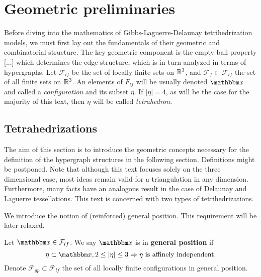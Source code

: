 \chapter{Geometric preliminaries}
Before diving into the mathematics of Gibbs-Laguerre-Delaunay tetrihedrization models, we must first lay out the fundamentals of their geometric and combinatorial structure. The key geometric component is the empty ball property [...] which determines the edge structure, which is in turn analyzed in terms of hypergraphs.
Let $\mathcal F_{lf}$ be the set of locally finite sets on ${\mathbb R^3}$, and $\mathcal F_{f} \subset \mathcal F_{lf}$ the set of all finite sets on ${\mathbb R^3}$. An elements of $F_{lf}$ will be usually denoted $\x$ and called a \textit{configuration} and its subset $\eta$. If $|\eta|=4$, as will be the case for the majority of this text, then $\eta$ will be called \textit{tetrahedron}.


\section{Tetrahedrizations}
The aim of this section is to introduce the geometric concepts necessary for the definition of the hypergraph structures in the following section. Definitions might be postponed. Note that although this text focuses solely on the three dimensional case, most ideas remain valid for a triangulation in any dimension. Furthermore, many facts have an analogous result in the case of Delaunay and Laguerre tessellations.
This text is concerned with two types of tetrihedrizations. 

We introduce the notion of (reinforced) general position. This requirement will be later relaxed.

\begin{definition}
Let $\x \in \mathcal F_{lf}$. We say $\x$ is in \textbf{general position} if 
$$ \eta \subset \x, 2 \leq |\eta| \leq 3 \Rightarrow \eta \text{ is affinely independent.} $$   
Denote $\mathcal F_{gp}\subset \mathcal F_{lf}$ the set of all locally finite configurations in general position.
\end{definition}
 
